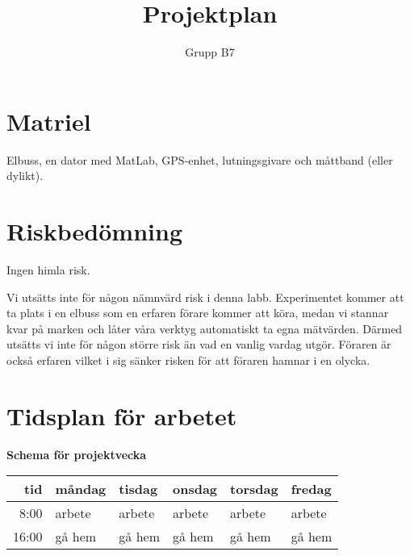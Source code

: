 \documentclass[]{article}
\title{Projektplan}
\author{Grupp B7}
\begin{document}
\maketitle



\section{Matriel}
Elbuss, en dator med MatLab, GPS-enhet, lutningsgivare och
måttband (eller dylikt).



\section{Riskbedömning}
Ingen himla risk.

Vi utsätts inte för någon nämnvärd risk i denna labb.
Experimentet kommer att ta plats i en elbuss som en erfaren förare kommer att köra,
medan vi stannar kvar på marken och låter våra verktyg automatiskt ta egna mätvärden.
Därmed utsätts vi inte för någon större risk än vad en vanlig vardag utgör.
Föraren är också erfaren vilket i sig sänker risken för att föraren hamnar i en olycka.

\section{Tidsplan för arbetet}
\begin{center}
	{\textbf{Schema för projektvecka}}
\begin{tabular}{r | l l l l l }
	tid & måndag & tisdag & onsdag & torsdag & fredag \\ \hline
	8:00 & arbete & arbete & arbete & arbete & arbete \\
	16:00 & gå hem & gå hem & gå hem & gå hem & gå hem \\ \hline

\end{tabular}
\end{center}

\clearpage
\printbibliography
\end{document}
